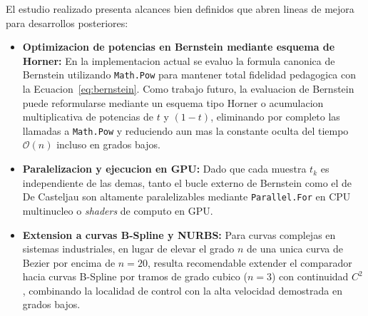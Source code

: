 El estudio realizado presenta alcances bien definidos que abren lineas de mejora para desarrollos posteriores:

\begin{itemize}
    \item \textbf{Optimizacion de potencias en Bernstein mediante esquema de Horner:} En la implementacion actual se evaluo la formula canonica de Bernstein utilizando \texttt{Math.Pow} para mantener total fidelidad pedagogica con la Ecuacion~\ref{eq:bernstein}. Como trabajo futuro, la evaluacion de Bernstein puede reformularse mediante un esquema tipo Horner o acumulacion multiplicativa de potencias de $t$ y $(1-t)$, eliminando por completo las llamadas a \texttt{Math.Pow} y reduciendo aun mas la constante oculta del tiempo $\mathcal{O}(n)$ incluso en grados bajos.
    \item \textbf{Paralelizacion y ejecucion en GPU:} Dado que cada muestra $t_k$ es independiente de las demas, tanto el bucle externo de Bernstein como el de De Casteljau son altamente paralelizables mediante \texttt{Parallel.For} en CPU multinucleo o \textit{shaders} de computo en GPU.
    \item \textbf{Extension a curvas B-Spline y NURBS:} Para curvas complejas en sistemas industriales, en lugar de elevar el grado $n$ de una unica curva de Bezier por encima de $n = 20$, resulta recomendable extender el comparador hacia curvas B-Spline por tramos de grado cubico ($n = 3$) con continuidad $C^2$, combinando la localidad de control con la alta velocidad demostrada en grados bajos.
\end{itemize}

